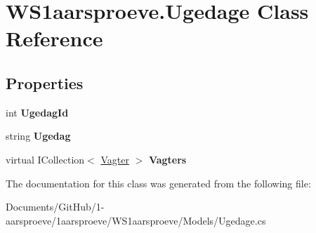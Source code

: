 \hypertarget{class_w_s1aarsproeve_1_1_ugedage}{}\section{W\+S1aarsproeve.\+Ugedage Class Reference}
\label{class_w_s1aarsproeve_1_1_ugedage}
\subsection*{Properties}
\begin{DoxyCompactItemize}
\item 
\hypertarget{class_w_s1aarsproeve_1_1_ugedage_af22c4158db6879ee298b5d5785645a62}{}int {\bfseries Ugedag\+Id}\label{class_w_s1aarsproeve_1_1_ugedage_af22c4158db6879ee298b5d5785645a62}

\item 
\hypertarget{class_w_s1aarsproeve_1_1_ugedage_a35425f19c224ca5c7060eaa9227fd9f5}{}string {\bfseries Ugedag}\label{class_w_s1aarsproeve_1_1_ugedage_a35425f19c224ca5c7060eaa9227fd9f5}

\item 
\hypertarget{class_w_s1aarsproeve_1_1_ugedage_aef92a219a1e8e815aea4b956059847ee}{}virtual I\+Collection$<$ \hyperlink{class_w_s1aarsproeve_1_1_vagter}{Vagter} $>$ {\bfseries Vagters}\label{class_w_s1aarsproeve_1_1_ugedage_aef92a219a1e8e815aea4b956059847ee}

\end{DoxyCompactItemize}


The documentation for this class was generated from the following file\+:\begin{DoxyCompactItemize}
\item 
Documents/\+Git\+Hub/1-\/aarsproeve/1aarsproeve/\+W\+S1aarsproeve/\+Models/Ugedage.\+cs\end{DoxyCompactItemize}
